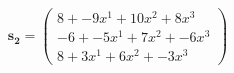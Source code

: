 \documentclass[preview]{standalone}
\begin{document}
\begin{align*}
\mathbf{s_2} = \begin{pmatrix}8 + -9x^{1} + 10x^{2} + 8x^{3} \\ -6 + -5x^{1} + 7x^{2} + -6x^{3} \\ 8 + 3x^{1} + 6x^{2} + -3x^{3}\end{pmatrix}
\end{align*}
\end{document}

